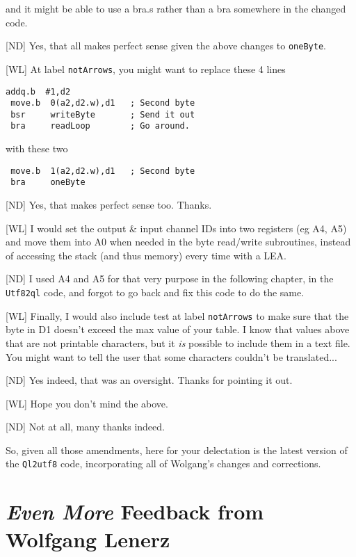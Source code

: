 and it might be able to use a bra.s rather than a bra somewhere in the changed code.

[ND] Yes, that all makes perfect sense given the above changes to \texttt{oneByte}.

[WL] At label \texttt{notArrows}, you might want to replace these 4 lines

\begin{lstlisting}[numbers=none]
 addq.b  #1,d2
 move.b  0(a2,d2.w),d1   ; Second byte
 bsr     writeByte       ; Send it out
 bra     readLoop        ; Go around.
\end{lstlisting}

with these two

\begin{lstlisting}
 move.b  1(a2,d2.w),d1   ; Second byte
 bra     oneByte
\end{lstlisting}
 
[ND] Yes, that makes perfect sense too. Thanks.


[WL] I would set the output \& input channel IDs into two registers (eg A4, A5) and move them into A0 when needed in the byte read/write subroutines, instead of accessing the stack (and thus memory) every time with a LEA.

[ND] I used A4 and A5 for that very purpose in the following chapter, in the \texttt{Utf82ql} code, and forgot to go back and fix this code to do the same.

[WL] Finally, I would also include  test at label \texttt{notArrows} to make sure that the byte in D1 doesn't exceed the max value of your table. I know that values above that are not printable characters, but it \emph{is} possible to include them in a text file. You might want to tell the user that some characters couldn't be translated...

[ND] Yes indeed, that was an oversight. Thanks for pointing it out.

[WL] Hope you don't mind the above.

[ND] Not at all, many thanks indeed.

So, given all those amendments, here for your delectation is the latest version of the \texttt{Ql2utf8} code, incorporating all of Wolgang's changes and corrections.


\section{\emph{Even More} Feedback from Wolfgang Lenerz}
	
